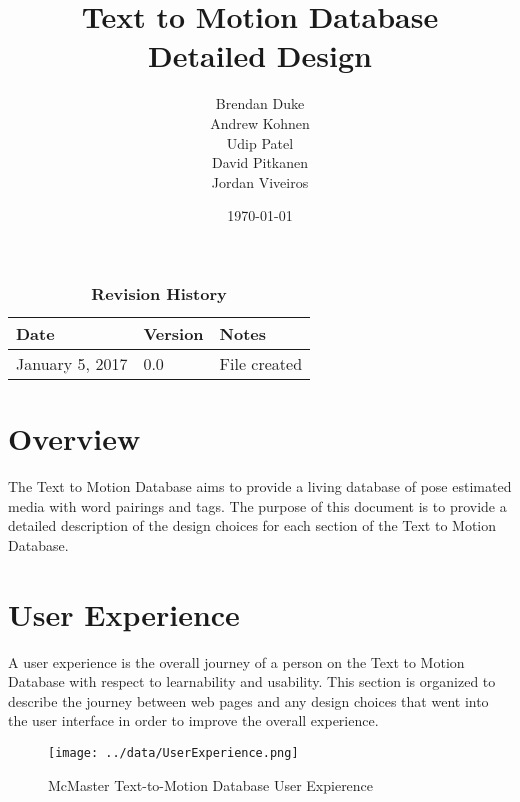 \documentclass{scrreprt}
\begin{document}
\title{\bf Text to Motion Database\\[\baselineskip]\Large Detailed Design}
\author{Brendan Duke\\Andrew Kohnen\\Udip Patel\\David Pitkanen\\Jordan Viveiros}
\date{\today}

\maketitle

\tableofcontents


\begin{table}[bp]
\caption*{\bf Revision History}
\begin{tabularx}{\textwidth}{p{3.5cm}p{2cm}X}
\toprule {\bf Date} & {\bf Version} & {\bf Notes}\\
\midrule
January 5, 2017 & 0.0 & File created\\
\bottomrule
\end{tabularx}
\end{table}

\newpage


\chapter{Overview}

The Text to Motion Database aims to provide a living database of pose estimated
media with word pairings and tags. The purpose of this document is to provide a
detailed description of the design choices for each section of the Text to
Motion Database.

\chapter{User Experience}

A user experience is the overall journey of a person on the Text to Motion
Database with respect to learnability and usability. This section is organized
to describe the journey between web pages and any design choices that went into
the user interface in order to improve the overall experience.

\begin{figure}[!ht]
        \caption{McMaster Text-to-Motion Database User Expierence}
        \label{userExp}
        \centering
        \texttt{[image: ../data/UserExperience.png]}
\end{figure}
\end{document}

